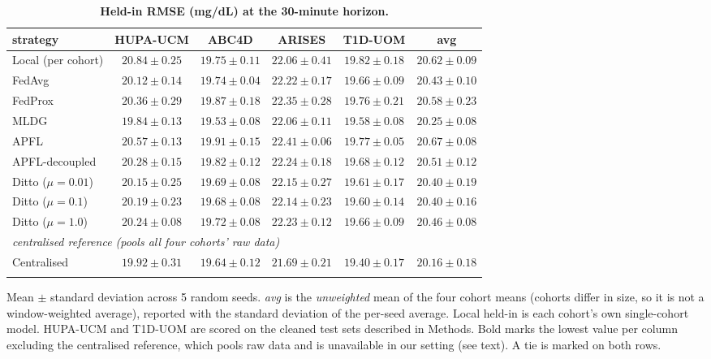 \documentclass[10pt,letterpaper]{article}
\newlength\savedwidth
\newcommand\thickhline{\noalign{\global\savedwidth\arrayrulewidth\global\arrayrulewidth 2pt}%
\hline
\noalign{\global\arrayrulewidth\savedwidth}}
\begin{document}
\begin{table}[!ht]
\centering
\captionsetup{justification=centering,singlelinecheck=on}
\caption{\bf Held-in RMSE (mg/dL) at the 30-minute horizon.}
\label{tab:main}
\begin{tabular}{lccccc}
\thickhline
strategy & HUPA-UCM & ABC4D & ARISES & T1D-UOM & avg \\
\hline
Local (per cohort) & $20.84 \pm 0.25$ & $19.75 \pm 0.11$ & $\mathbf{22.06 \pm 0.41}$ & $19.82 \pm 0.18$ & $20.62 \pm 0.09$ \\
\hline
FedAvg  & $20.12 \pm 0.14$ & $19.74 \pm 0.04$ & $22.22 \pm 0.17$ & $19.66 \pm 0.09$ & $20.43 \pm 0.10$ \\
FedProx & $20.36 \pm 0.29$ & $19.87 \pm 0.18$ & $22.35 \pm 0.28$ & $19.76 \pm 0.21$ & $20.58 \pm 0.23$ \\
MLDG    & $\mathbf{19.84 \pm 0.13}$ & $\mathbf{19.53 \pm 0.08}$ & $\mathbf{22.06 \pm 0.11}$ & $\mathbf{19.58 \pm 0.08}$ & $\mathbf{20.25 \pm 0.08}$ \\
\hline
APFL           & $20.57 \pm 0.13$ & $19.91 \pm 0.15$ & $22.41 \pm 0.06$ & $19.77 \pm 0.05$ & $20.67 \pm 0.08$ \\
APFL-decoupled & $20.28 \pm 0.15$ & $19.82 \pm 0.12$ & $22.24 \pm 0.18$ & $19.68 \pm 0.12$ & $20.51 \pm 0.12$ \\
Ditto ($\mu{=}0.01$) & $20.15 \pm 0.25$ & $19.69 \pm 0.08$ & $22.15 \pm 0.27$ & $19.61 \pm 0.17$ & $20.40 \pm 0.19$ \\
Ditto ($\mu{=}0.1$)  & $20.19 \pm 0.23$ & $19.68 \pm 0.08$ & $22.14 \pm 0.23$ & $19.60 \pm 0.14$ & $20.40 \pm 0.16$ \\
Ditto ($\mu{=}1.0$)  & $20.24 \pm 0.08$ & $19.72 \pm 0.08$ & $22.23 \pm 0.12$ & $19.66 \pm 0.09$ & $20.46 \pm 0.08$ \\
\hline
\multicolumn{6}{l}{\emph{centralised reference (pools all four cohorts' raw data)}} \\
Centralised & $19.92 \pm 0.31$ & $19.64 \pm 0.12$ & $21.69 \pm 0.21$ & $19.40 \pm 0.17$ & $20.16 \pm 0.18$ \\
\thickhline
\end{tabular}
\begin{center}
{\small Mean $\pm$ standard deviation across 5 random seeds.
\emph{avg} is the \emph{unweighted} mean of the four cohort means (cohorts differ
in size, so it is not a window-weighted average), reported with the standard
deviation of the per-seed average. Local held-in is each cohort's own
single-cohort model. HUPA-UCM and T1D-UOM are scored on the cleaned test sets
described in Methods. Bold marks the lowest value per column excluding the
centralised reference, which pools raw data and is unavailable in our setting
(see text). A tie is marked on both rows.}
\end{center}
\end{table}
\end{document}
